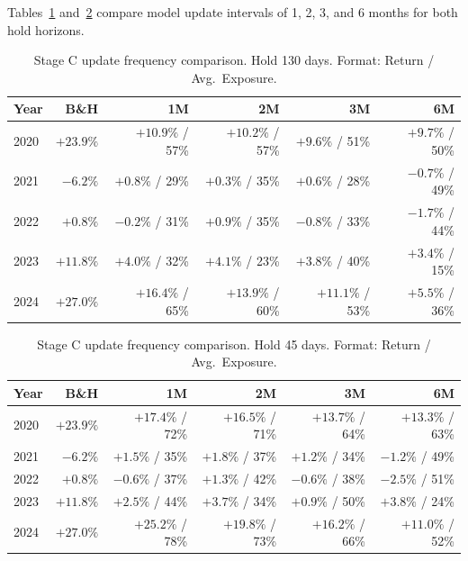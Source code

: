\documentclass[11pt, letterpaper]{article}
\begin{document}
Tables~\ref{tab:update_h130} and~\ref{tab:update_h45} compare model update
intervals of 1, 2, 3, and 6 months for both hold horizons.

\begin{table}[h]
\centering
\caption{Stage C update frequency comparison. Hold 130 days. Format: Return / Avg.\ Exposure.}
\label{tab:update_h130}
\begin{tabular}{lrrrrr}
\toprule
Year    & B\&H      & 1M                   & 2M                   & 3M                   & 6M \\
\midrule
2020    & $+23.9\%$ & $+10.9\%$ / 57\%     & $+10.2\%$ / 57\%     & $+9.6\%$ / 51\%      & $+9.7\%$ / 50\% \\
2021    & $-6.2\%$  & $+0.8\%$ / 29\%      & $+0.3\%$ / 35\%      & $+0.6\%$ / 28\%      & $-0.7\%$ / 49\% \\
2022    & $+0.8\%$  & $-0.2\%$ / 31\%      & $+0.9\%$ / 35\%      & $-0.8\%$ / 33\%      & $-1.7\%$ / 44\% \\
2023    & $+11.8\%$ & $+4.0\%$ / 32\%      & $+4.1\%$ / 23\%      & $+3.8\%$ / 40\%      & $+3.4\%$ / 15\% \\
2024    & $+27.0\%$ & $\mathbf{+16.4\%}$ / 65\% & $+13.9\%$ / 60\% & $+11.1\%$ / 53\%    & $+5.5\%$ / 36\% \\
\bottomrule
\end{tabular}
\end{table}

\begin{table}[h]
\centering
\caption{Stage C update frequency comparison. Hold 45 days. Format: Return / Avg.\ Exposure.}
\label{tab:update_h45}
\begin{tabular}{lrrrrr}
\toprule
Year    & B\&H      & 1M                   & 2M                   & 3M                   & 6M \\
\midrule
2020    & $+23.9\%$ & $+17.4\%$ / 72\%     & $+16.5\%$ / 71\%     & $+13.7\%$ / 64\%     & $+13.3\%$ / 63\% \\
2021    & $-6.2\%$  & $+1.5\%$ / 35\%      & $+1.8\%$ / 37\%      & $+1.2\%$ / 34\%      & $-1.2\%$ / 49\% \\
2022    & $+0.8\%$  & $-0.6\%$ / 37\%      & $+1.3\%$ / 42\%      & $-0.6\%$ / 38\%      & $-2.5\%$ / 51\% \\
2023    & $+11.8\%$ & $+2.5\%$ / 44\%      & $+3.7\%$ / 34\%      & $+0.9\%$ / 50\%      & $+3.8\%$ / 24\% \\
2024    & $+27.0\%$ & $\mathbf{+25.2\%}$ / 78\% & $+19.8\%$ / 73\% & $+16.2\%$ / 66\%    & $+11.0\%$ / 52\% \\
\bottomrule
\end{tabular}
\end{table}
\end{document}
